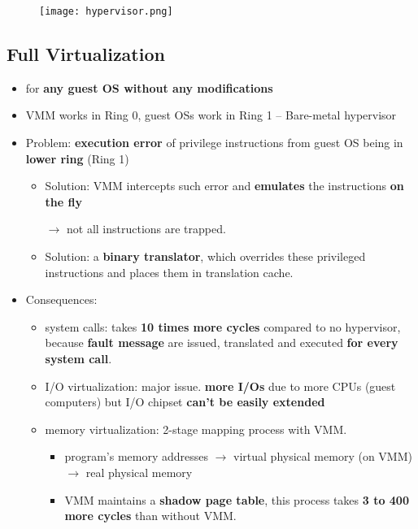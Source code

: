 \begin{figure}[H]
	\centering
	\texttt{[image: hypervisor.png]}
\end{figure}

\subsection{Full Virtualization}
\begin{itemize}
	\item for \textbf{any guest OS without any modifications} 
	\item VMM works in Ring 0, guest OSs work in Ring 1  -- Bare-metal hypervisor
	\item Problem: \textbf{execution error} of privilege instructions from guest OS being in \textbf{lower ring} (Ring 1)
	\begin{itemize}
		\item Solution: VMM intercepts such error and \textbf{emulates} the instructions \textbf{on the fly}
		
		$\rightarrow$ not all instructions are trapped.
		
		\item Solution: a \textbf{binary translator}, which overrides these privileged instructions and places them in translation cache. 
	\end{itemize}
	\item Consequences:
	\begin{itemize}
		\item system calls: takes \textbf{10 times more cycles} compared to no hypervisor, because \textbf{fault message} are issued, translated and executed \textbf{for every system call}. 
		
		\item I/O virtualization: major issue. \textbf{more I/Os} due to more CPUs (guest computers) but I/O chipset \textbf{can't be easily extended}
		
		
		\item memory virtualization: 2-stage mapping process with VMM.
		\begin{itemize}
			\item program's memory addresses $\rightarrow$ virtual physical memory (on VMM) $\rightarrow$ real physical memory
			\item VMM maintains a \textbf{shadow page table}, this process takes \textbf{3 to 400 more cycles} than without VMM.
		\end{itemize}
		
		
	\end{itemize}
	

\end{itemize}

